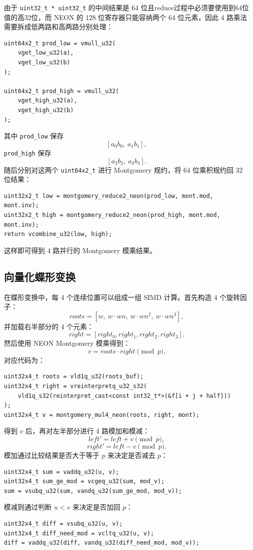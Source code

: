 \documentclass[a4paper]{article}
\begin{document}
由于 \texttt{uint32\_t * uint32\_t} 的中间结果是 64 位且reduce过程中必须要使用到64位值的高32位，而 NEON 的 128 位寄存器只能容纳两个 64 位元素，因此 4 路乘法需要拆成低两路和高两路分别处理：
\begin{lstlisting}
uint64x2_t prod_low = vmull_u32(
    vget_low_u32(a),
    vget_low_u32(b)
);

uint64x2_t prod_high = vmull_u32(
    vget_high_u32(a),
    vget_high_u32(b)
);
\end{lstlisting}

其中 \texttt{prod\_low} 保存
\[
[a_0b_0,\ a_1b_1],
\]
\texttt{prod\_high} 保存
\[
[a_2b_2,\ a_3b_3].
\]
随后分别对这两个 \texttt{uint64x2\_t} 进行 Montgomery 规约，将 64 位乘积规约回 32 位结果：
\begin{lstlisting}
uint32x2_t low = montgomery_reduce2_neon(prod_low, mont.mod, mont.inv);
uint32x2_t high = montgomery_reduce2_neon(prod_high, mont.mod, mont.inv);
return vcombine_u32(low, high);
\end{lstlisting}

这样即可得到 4 路并行的 Montgomery 模乘结果。

\subsection{向量化蝶形变换}
在蝶形变换中，每 4 个连续位置可以组成一组 SIMD 计算。首先构造 4 个旋转因子：
\[
roots=[w,\ w\cdot wn,\ w\cdot wn^2,\ w\cdot wn^3],
\]
并加载右半部分的 4 个元素：
\[
right=[right_0,right_1,right_2,right_3].
\]
然后使用 NEON Montgomery 模乘得到：
\[
v=roots\cdot right\pmod p.
\]
对应代码为：
\begin{lstlisting}
uint32x4_t roots = vld1q_u32(roots_buf);
uint32x4_t right = vreinterpretq_u32_s32(
    vld1q_s32(reinterpret_cast<const int32_t*>(&f[i + j + half]))
);
uint32x4_t v = montgomery_mul4_neon(roots, right, mont);
\end{lstlisting}

得到 \(v\) 后，再对左半部分进行 4 路模加和模减：
\[
left'=left+v\pmod p,
\]
\[
right'=left-v\pmod p.
\]
模加通过比较结果是否大于等于 \(p\) 来决定是否减去 \(p\)：
\begin{lstlisting}
uint32x4_t sum = vaddq_u32(u, v);
uint32x4_t sum_ge_mod = vcgeq_u32(sum, mod_v);
sum = vsubq_u32(sum, vandq_u32(sum_ge_mod, mod_v));
\end{lstlisting}

模减则通过判断 \(u<v\) 来决定是否加回 \(p\)：
\begin{lstlisting}
uint32x4_t diff = vsubq_u32(u, v);
uint32x4_t diff_need_mod = vcltq_u32(u, v);
diff = vaddq_u32(diff, vandq_u32(diff_need_mod, mod_v));
\end{lstlisting}
\end{document}
